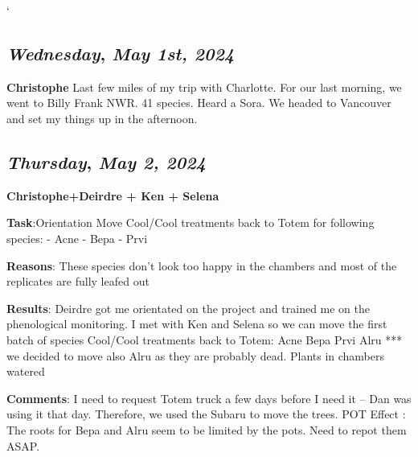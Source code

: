 `\begin{center}
\section*{\month}
\end{center}

\def\day{\textit{May 1st, 2024}}
\def\weekday{\textit{Wednesday}}
\subsection*{\weekday, \day}
\textbf{Christophe}
Last few miles of my trip with Charlotte. For our last morning, we went to Billy Frank NWR. 41 species. Heard a Sora. 
We headed to Vancouver and set my things up in the afternoon. 

\def\day{\textit{May 2, 2024}}
\def\weekday{\textit{Thursday}}
\subsection*{\weekday, \day}
\textbf{Christophe+Deirdre + Ken + Selena}
\par 
\textbf {Task}:Orientation
Move Cool/Cool treatments back to Totem for following species:
- Acne
- Bepa
- Prvi
\par 
\textbf {Reasons}: These species don’t look too happy in the chambers and most of the replicates are fully leafed out
\par 
\textbf {Results}: Deirdre got me orientated on the project and trained me on the phenological monitoring.
I met with Ken and Selena so we can move the first batch of species Cool/Cool treatments back to Totem:
Acne
Bepa
Prvi
Alru
*** we decided to move also Alru as they are probably dead. 
Plants in chambers watered 
\par 
\textbf {Comments}: I need to request Totem truck a few days before I need it – Dan was using it that day. Therefore, we used the Subaru to move the trees. 
POT Effect : The roots for Bepa and Alru seem to be limited by the pots. Need to repot them ASAP. 

\def\day{\textit{May 3, 2024}}
\def\weekday{\textit{Friday}}
